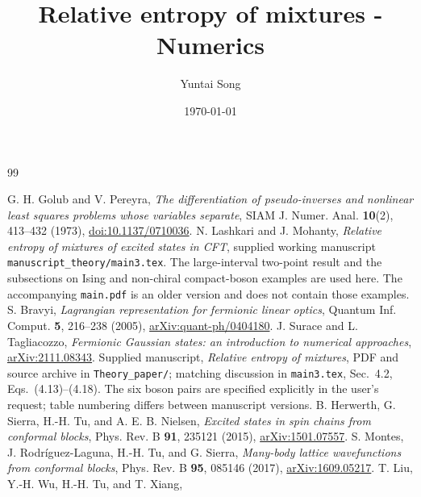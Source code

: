 \documentclass[11pt]{article}
\title{Relative entropy of mixtures - Numerics}
\author{Yuntai Song}
\date{\today}
\begin{document}
\maketitle
\tableofcontents






\appendix






\begin{thebibliography}{99}
\raggedright
\small
{} G. H. Golub and V. Pereyra,
\emph{The differentiation of pseudo-inverses and nonlinear least
squares problems whose variables separate}, SIAM J. Numer. Anal.
\textbf{10}(2), 413--432 (1973),
\href{https://doi.org/10.1137/0710036}{doi:10.1137/0710036}.
 N. Lashkari and J. Mohanty,
\emph{Relative entropy of mixtures of excited states in CFT},
supplied working manuscript \texttt{manuscript\_theory/main3.tex}.
The large-interval two-point result and the subsections on Ising and
non-chiral compact-boson examples are used here. The accompanying
\texttt{main.pdf} is an older version and does not contain those examples.
 S. Bravyi,
\emph{Lagrangian representation for fermionic linear optics},
Quantum Inf. Comput. \textbf{5}, 216--238 (2005),
\href{https://arxiv.org/abs/quant-ph/0404180}{arXiv:quant-ph/0404180}.
 J. Surace and L. Tagliacozzo,
\emph{Fermionic Gaussian states: an introduction to numerical approaches},
\href{https://arxiv.org/abs/2111.08343}{arXiv:2111.08343}.
 Supplied manuscript, \emph{Relative entropy of mixtures},
PDF and source archive in \texttt{Theory\_paper/}; matching discussion
in \texttt{main3.tex}, Sec.~4.2, Eqs.~(4.13)--(4.18). The six boson pairs
are specified explicitly in the user's request; table numbering differs
between manuscript versions.
 B. Herwerth, G. Sierra, H.-H. Tu, and A. E. B. Nielsen,
\emph{Excited states in spin chains from conformal blocks},
Phys. Rev. B \textbf{91}, 235121 (2015),
\href{https://arxiv.org/abs/1501.07557}{arXiv:1501.07557}.
 S. Montes, J. Rodr\'{i}guez-Laguna, H.-H. Tu, and G. Sierra,
\emph{Many-body lattice wavefunctions from conformal blocks},
Phys. Rev. B \textbf{95}, 085146 (2017),
\href{https://arxiv.org/abs/1609.05217}{arXiv:1609.05217}.
 T. Liu, Y.-H. Wu, H.-H. Tu, and T. Xiang,

\end{thebibliography}
\end{document}
